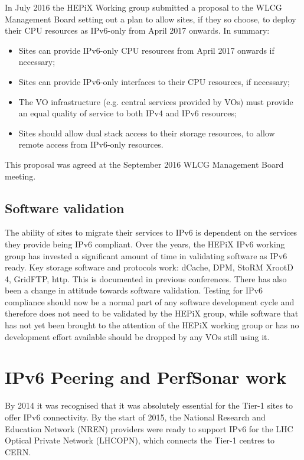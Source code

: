 \documentclass[a4paper]{jpconf}
\begin{document}
In July 2016 the HEPiX Working group submitted a proposal to the WLCG
Management Board setting out a plan to allow sites, if they so choose,
to deploy their CPU resources as IPv6-only from April 2017 onwards.  In summary: 

\begin{itemize}
\item Sites can provide IPv6-only CPU resources from April 2017 onwards if necessary;
\item Sites can provide IPv6-only interfaces to their CPU resources, if necessary;
\item The VO infrastructure (e.g. central services provided by VOs) must provide an equal quality of service to both IPv4 and IPv6 resources;
\item Sites should allow dual stack access to their storage resources, to allow remote access from IPv6-only resources.
\end{itemize}
This proposal was agreed at the September 2016 WLCG Management Board meeting.

\subsection{Software validation}
The ability of sites to migrate their services to IPv6 is dependent on the services they provide being IPv6 compliant.  Over the years, the HEPiX IPv6 working group has invested a significant amount of time in validating software as IPv6 ready.  Key storage software and protocols work: dCache, DPM, StoRM XrootD 4, GridFTP, http. This is documented in previous conferences\cite{CHEP15}.  There has also been a change in attitude towards software validation.  Testing for IPv6 compliance should now be a normal part of any software development cycle and therefore does not need to be validated by the HEPiX group, while software that has not yet been brought to the attention of the HEPiX working group or has no development effort available should be dropped by any VOs still using it.  

\section{IPv6 Peering and PerfSonar work}
By 2014 it was recognised that it was absolutely essential for the Tier-1 sites to offer
IPv6 connectivity. By the start of 2015, the National Research and Education Network (NREN) 
providers were ready to support IPv6 for the LHC Optical Private Network (LHCOPN), which connects the Tier-1 
centres to CERN.
\end{document}
